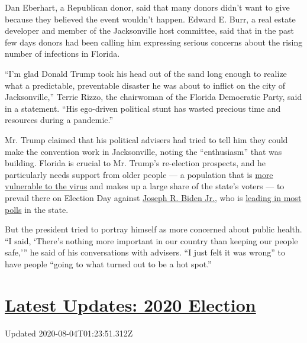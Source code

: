 Dan Eberhart, a Republican donor, said that many donors didn't want to
give because they believed the event wouldn't happen. Edward E. Burr, a
real estate developer and member of the Jacksonville host committee,
said that in the past few days donors had been calling him expressing
serious concerns about the rising number of infections in Florida.

``I'm glad Donald Trump took his head out of the sand long enough to
realize what a predictable, preventable disaster he was about to inflict
on the city of Jacksonville,'' Terrie Rizzo, the chairwoman of the
Florida Democratic Party, said in a statement. ``His ego-driven
political stunt has wasted precious time and resources during a
pandemic.''

Mr. Trump claimed that his political advisers had tried to tell him they
could make the convention work in Jacksonville, noting the
``enthusiasm'' that was building. Florida is crucial to Mr. Trump's
re-election prospects, and he particularly needs support from older
people --- a population that is
\href{https://www.nytimes3xbfgragh.onion/2020/07/20/us/coronavirus-florida-elderly.html}{more
vulnerable to the virus} and makes up a large share of the state's
voters --- to prevail there on Election Day against
\href{https://www.nytimes3xbfgragh.onion/interactive/2020/us/elections/joe-biden.html}{Joseph
R. Biden Jr.}, who is
\href{https://www.realclearpolitics.com/epolls/2020/president/fl/florida_trump_vs_biden-6841.html\#polls}{leading
in most polls} in the state.

But the president tried to portray himself as more concerned about
public health. ``I said, `There's nothing more important in our country
than keeping our people safe,''' he said of his conversations with
advisers. ``I just felt it was wrong'' to have people ``going to what
turned out to be a hot spot.''

\hypertarget{latest-updates-2020-election}{%
\section{\texorpdfstring{\href{https://www.nytimes3xbfgragh.onion/2020/08/03/us/elections/biden-vs-trump.html?action=click\&pgtype=Article\&state=default\&region=MAIN_CONTENT_1\&context=storylines_live_updates}{Latest
Updates: 2020
Election}}{Latest Updates: 2020 Election}}\label{latest-updates-2020-election}}

Updated 2020-08-04T01:23:51.312Z

